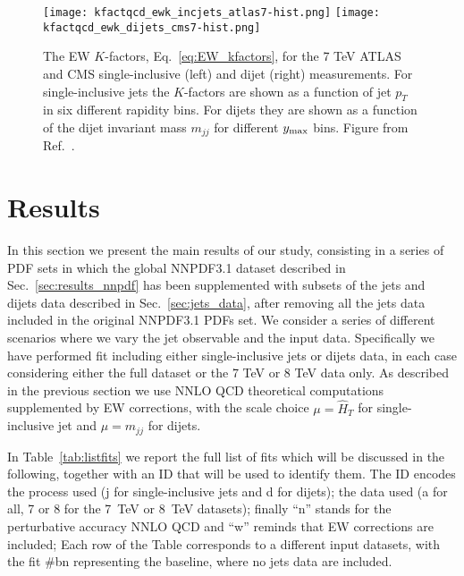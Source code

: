 \begin{figure}[!t]
    \centering
    \texttt{[image: kfactqcd\_ewk\_incjets\_atlas7-hist.png]}
    \texttt{[image: kfactqcd\_ewk\_dijets\_cms7-hist.png]}\\
    \caption{The EW $K$-factors, Eq.~\eqref{eq:EW_kfactors}, for the 7 TeV ATLAS and CMS
       single-inclusive (left) and dijet (right)  measurements. For 
       single-inclusive jets the $K$-factors are shown as a function of jet $p_T$ 
       in six different rapidity bins. For dijets they are shown as a function of 
       the dijet invariant mass $m_{jj}$ for different $y_{\rm max}$ bins. Figure from Ref.~\cite{AbdulKhalek:2020jut}.}
    \label{fig:kfactewk_dijets7}
\end{figure}





\section{Results}
\label{sec:jets_res}
In this section we present the main results of our study, consisting in a series of PDF sets
in which the global NNPDF3.1 dataset described in Sec.~\ref{sec:results_nnpdf} has been supplemented with
subsets of the jets and dijets data described in Sec.~\ref{sec:jets_data}, after removing all the jets data included in
the original NNPDF3.1 PDFs set.
We consider a series of different scenarios where we vary the jet observable and the input data. 
Specifically we have performed fit including either single-inclusive jets or dijets data, in each case considering
either the full dataset or the 7 TeV or 8 TeV data only. 
As described in the previous section we use NNLO QCD theoretical computations supplemented by EW corrections, 
with the scale choice $\mu = \hat{H}_T$ for single-inclusive jet and $\mu = m_{jj}$ for dijets.

%
In Table~\ref{tab:listfits} we report the full list of fits which will be discussed in the following, together 
with an ID that will be used to identify them.
The ID encodes the process used (j for single-inclusive
jets and d for dijets); the data used (a for all, 7 or 8 for the
7~TeV or 8~TeV datasets); 
finally ``n'' stands for the perturbative accuracy NNLO QCD and ``w'' reminds that EW corrections are included;
Each row of the Table corresponds to a different input datasets, with the fit \#bn representing the baseline, where no jets
data are included. 

